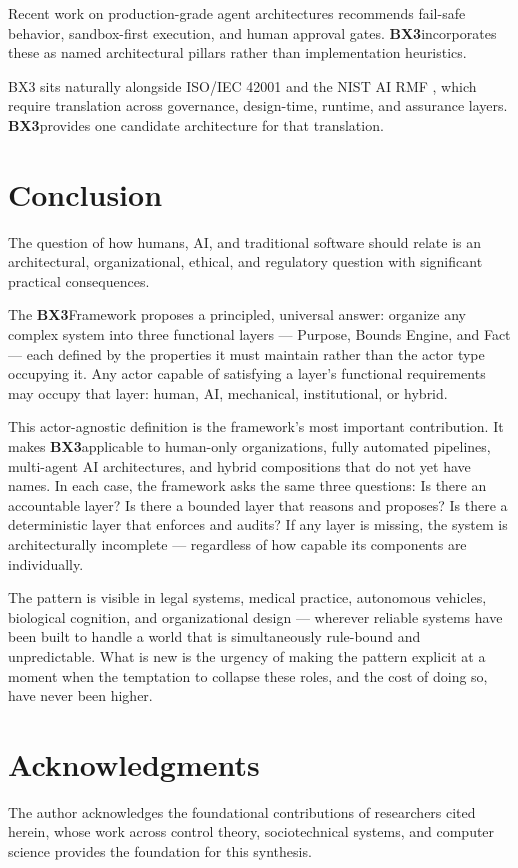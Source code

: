 \documentclass[12pt]{article}
\newcommand{\bxthree}{\textbf{BX3}}
\begin{document}
Recent work on production-grade agent architectures \cite{alenezi2026} recommends fail-safe behavior, sandbox-first execution, and human approval gates. \bxthree incorporates these as named architectural pillars rather than implementation heuristics.

BX3 sits naturally alongside ISO/IEC 42001 \cite{iso2023} and the NIST AI RMF \cite{nist2023}, which require translation across governance, design-time, runtime, and assurance layers. \bxthree provides one candidate architecture for that translation.

\section{Conclusion}
\label{sec:conclusion}

The question of how humans, AI, and traditional software should relate is an architectural, organizational, ethical, and regulatory question with significant practical consequences.

The \bxthree Framework proposes a principled, universal answer: organize any complex system into three functional layers --- Purpose, Bounds Engine, and Fact --- each defined by the properties it must maintain rather than the actor type occupying it. Any actor capable of satisfying a layer's functional requirements may occupy that layer: human, AI, mechanical, institutional, or hybrid.

This actor-agnostic definition is the framework's most important contribution. It makes \bxthree applicable to human-only organizations, fully automated pipelines, multi-agent AI architectures, and hybrid compositions that do not yet have names. In each case, the framework asks the same three questions: Is there an accountable layer? Is there a bounded layer that reasons and proposes? Is there a deterministic layer that enforces and audits? If any layer is missing, the system is architecturally incomplete --- regardless of how capable its components are individually.

The pattern is visible in legal systems, medical practice, autonomous vehicles, biological cognition, and organizational design --- wherever reliable systems have been built to handle a world that is simultaneously rule-bound and unpredictable. What is new is the urgency of making the pattern explicit at a moment when the temptation to collapse these roles, and the cost of doing so, have never been higher.

\section*{Acknowledgments}
The author acknowledges the foundational contributions of researchers cited herein, whose work across control theory, sociotechnical systems, and computer science provides the foundation for this synthesis.



\end{document}
